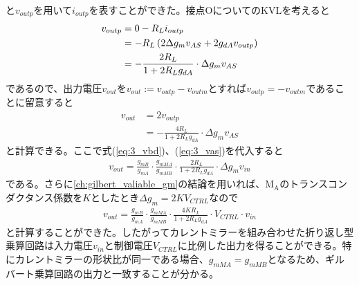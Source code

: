         と$v_{outp}$を用いて$i_{outp}$を表すことができた。接点OについてのKVLを考えると
        \begin{align}
            v_{outp}&=0-R_{L}i_{outp}       \notag\\
            &=-R_{L}\left( 2\Delta g_{m}v_{AS}+2g_{dA}v_{outp}  \right)       \notag\\
            &=-\frac{ 2R_{L} }{ 1+2R_{L}g_{dA} } \cdot \Delta g_{m}v_{AS}       \label{eq:3_voutp}    
        \end{align}
        であるので、出力電圧$v_{out}$を$v_{out}:=v_{outp}-v_{outm}$とすれば$v_{outp}=-v_{outm}$であることに留意すると
        \begin{align*}
            v_{out}&=2v_{outp}  \\
            &=-\frac{ 4R_{L} }{ 1+2R_{L}g_{dA} } \cdot \Delta g_{m}v_{AS}
        \end{align*}
        と計算できる。ここで式(\ref{eq:3_vbd})、(\ref{eq:3_vas})を代入すると
        \begin{align*}
            v_{out}=\frac{ g_{mB} }{ g_{mA} }\cdot\frac{ g_{mMA} }{ g_{mMB} }\cdot\frac{ 2R_{L} }{ 1+2R_{L} g_{dA}}\cdot\Delta g_{m}v_{in}
        \end{align*}
        である。さらに\ref{ch:gilbert_valiable_gm}の結論を用いれば、$\mathrm{M_{A}}$のトランスコンダクタンス係数を$K$としたとき$\Delta g_{m}=2KV_{CTRL}$なので
        \begin{align}
            v_{out}=\frac{ g_{mB} }{ g_{mA} }\cdot\frac{ g_{mMA} }{ g_{mMB} }\cdot\frac{ 4KR_{L} }{ 1+2R_{L} g_{dA}}\cdot V_{CTRL}\cdot v_{in}      \label{eq:3_vout}
        \end{align}
        と計算することができた。したがってカレントミラーを組み合わせた折り返し型乗算回路は入力電圧$v_{in}$と制御電圧$V_{CTRL}$に比例した出力を得ることができる。特にカレントミラーの形状比が同一である場合、$g_{mMA}=g_{mMB}$となるため、ギルバート乗算回路の出力と一致することが分かる。


